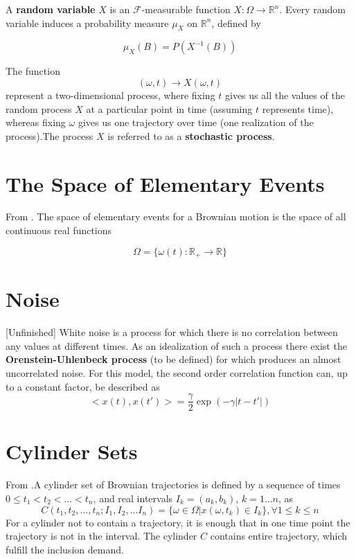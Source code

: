 \documentclass[12pt]{report}
\begin{document}
A \textbf{random variable} $X$ is an $\mathcal{F}$-measurable function $X:\Omega\rightarrow \mathbb{R}^n$. Every random variable induces a probability measure $\mu_X$ on $\mathbb{R}^n$, defined by 

\begin{equation*}
\mu_X(B) = P(X^{-1}(B))
\end{equation*}

The function 
\begin{equation*}
(\omega,t)\rightarrow X(\omega,t)
\end{equation*}
represent a two-dimensional process, where fixing $t$ gives us all the values of the random process $X$ at a particular point in time (assuming $t$ represents time), whereas fixing $\omega$ gives us one trajectory over time (one realization of the process).The process $X$ is referred to as a \textbf{stochastic process}.


\section{The Space of Elementary Events}
From \cite{schuss2009theory}. The space of elementary events for a Brownian motion is the space of all continuous real functions 

\begin{equation*}
\Omega=\{\omega(t):\mathbb{R}_+\rightarrow\mathbb{R}\}
\end{equation*}


\section{Noise}[Unfinished]
White noise is a process for which there is no correlation between any values at different times. As an idealization of such a process there exist the \textbf{Orenstein-Uhlenbeck process} (to be defined) for which produces an almost uncorrelated noise. For this model, the second order correlation function can, up to a constant factor, be described as 
\begin{equation*}
<x(t),x(t')>= \frac{\gamma}{2}\exp(-\gamma|t-t'|)
\end{equation*}

\section{Cylinder Sets}
From \cite{schuss2009theory}.A cylinder set of Brownian trajectories is defined by a sequence of times $0\leq t_1<t_2<...<t_n$, and real intervals $I_k=(a_k,b_k)$, $k=1...n$, as 
\begin{equation*}
C(t_1,t_2,...,t_n;I_1,I_2,...I_n)=\{\omega\in \Omega|x(\omega,t_k)\in I_k\},\forall 1\leq k \leq n
\end{equation*}
For a cylinder not to contain a trajectory, it is enough that in one time point the trajectory is not in the interval.
The cylinder $C$ contains entire trajectory, which fulfill the inclusion demand. 
\end{document}
